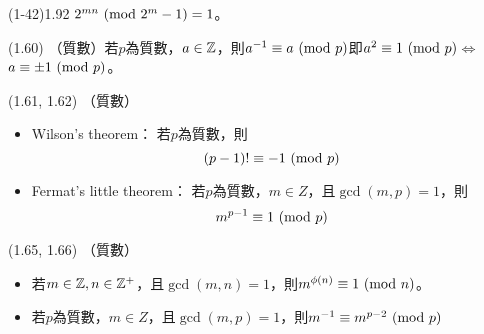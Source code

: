 \item \begin{theorem}{(1-42)1.92} $2^{mn} \ (\mathrm{mod}\ 2^m - 1) = 1$。
\end{theorem}

\item \begin{theorem}{(1.60)} （質數）若$p$為質數，$a \in \mathbb{Z}$，則$a^{-1} \equiv a \ (\mathrm{mod}\ p)$即$a^2 \equiv 1 \ (\mathrm{mod}\ p)$$\iff$$a \equiv \pm 1 \ (\mathrm{mod}\ p)$。
\end{theorem}

\item \begin{theorem}{(1.61, 1.62)} （質數）
    \begin{itemize}
        \item Wilson's theorem：
        若$p$為質數，則
        \begin{equation}
            (p - 1)! \equiv -1 \ (\mathrm{mod}\ p)
        \end{equation}
        \item Fermat's little theorem：
        若$p$為質數，$m \in Z$，且$\gcd(m, p) = 1$，則
        \begin{equation}
            m^{p - 1} \equiv 1 \ (\mathrm{mod}\ p)
        \end{equation}
    \end{itemize}
\end{theorem}

\item \begin{theorem}{(1.65, 1.66)} （質數）
    \begin{itemize}
        \item 若$m \in \mathbb{Z}, n \in \mathbb{Z}^+$，且$\gcd(m, n) = 1$，則$m^{\phi(n)} \equiv 1 \ (\mathrm{mod}\ n)$。
        \item 若$p$為質數，$m \in Z$，且$\gcd(m, p) = 1$，則$m^{-1} \equiv m^{p - 2} \ (\mathrm{mod}\ p)$
    \end{itemize}
\end{theorem}

